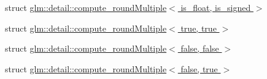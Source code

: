 \begin{DoxyCompactItemize}
\item 
struct \hyperlink{structglm_1_1detail_1_1compute__roundMultiple}{glm\+::detail\+::compute\+\_\+round\+Multiple$<$ is\+\_\+float, is\+\_\+signed $>$}
\item 
struct \hyperlink{structglm_1_1detail_1_1compute__roundMultiple_3_01true_00_01true_01_4}{glm\+::detail\+::compute\+\_\+round\+Multiple$<$ true, true $>$}
\item 
struct \hyperlink{structglm_1_1detail_1_1compute__roundMultiple_3_01false_00_01false_01_4}{glm\+::detail\+::compute\+\_\+round\+Multiple$<$ false, false $>$}
\item 
struct \hyperlink{structglm_1_1detail_1_1compute__roundMultiple_3_01false_00_01true_01_4}{glm\+::detail\+::compute\+\_\+round\+Multiple$<$ false, true $>$}
\end{DoxyCompactItemize}
